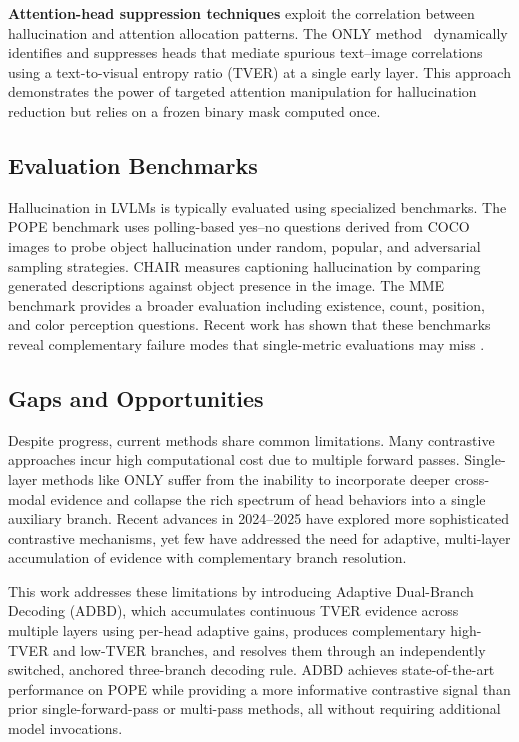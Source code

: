 \textbf{Attention-head suppression techniques} exploit the correlation between hallucination and attention allocation patterns. The ONLY method~\cite{wan2025only} dynamically identifies and suppresses heads that mediate spurious text--image correlations using a text-to-visual entropy ratio (TVER) at a single early layer. This approach demonstrates the power of targeted attention manipulation for hallucination reduction but relies on a frozen binary mask computed once.

\subsection{Evaluation Benchmarks}
Hallucination in LVLMs is typically evaluated using specialized benchmarks. The POPE benchmark \cite{li2023pope} uses polling-based yes--no questions derived from COCO images to probe object hallucination under random, popular, and adversarial sampling strategies. CHAIR \cite{rohrbach2018object} measures captioning hallucination by comparing generated descriptions against object presence in the image. The MME benchmark \cite{fu2023mme} provides a broader evaluation including existence, count, position, and color perception questions. Recent work has shown that these benchmarks reveal complementary failure modes that single-metric evaluations may miss \cite{wan2025only}.

\subsection{Gaps and Opportunities}
Despite progress, current methods share common limitations. Many contrastive approaches incur high computational cost due to multiple forward passes. Single-layer methods like ONLY suffer from the inability to incorporate deeper cross-modal evidence and collapse the rich spectrum of head behaviors into a single auxiliary branch. Recent advances in 2024--2025 have explored more sophisticated contrastive mechanisms, yet few have addressed the need for adaptive, multi-layer accumulation of evidence with complementary branch resolution.

This work addresses these limitations by introducing Adaptive Dual-Branch Decoding (ADBD), which accumulates continuous TVER evidence across multiple layers using per-head adaptive gains, produces complementary high-TVER and low-TVER branches, and resolves them through an independently switched, anchored three-branch decoding rule. ADBD achieves state-of-the-art performance on POPE while providing a more informative contrastive signal than prior single-forward-pass or multi-pass methods, all without requiring additional model invocations.
